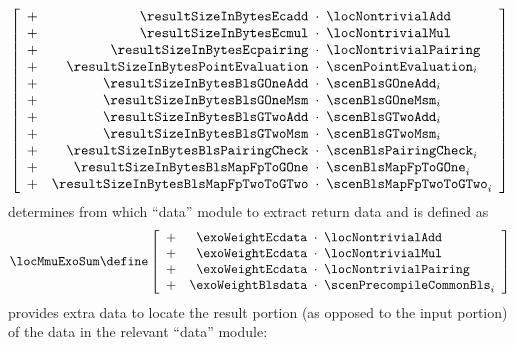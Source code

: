 \begin{description}
\begin{description}
\[					\left[ \begin{array}{crcl}
						+ & \resultSizeInBytesEcadd             & \!\!\!\cdot\!\!\! & \locNontrivialAdd            \\
						+ & \resultSizeInBytesEcmul             & \!\!\!\cdot\!\!\! & \locNontrivialMul            \\
						+ & \resultSizeInBytesEcpairing         & \!\!\!\cdot\!\!\! & \locNontrivialPairing        \\
						+ & \resultSizeInBytesPointEvaluation   & \!\!\!\cdot\!\!\! & \scenPointEvaluation    _{i} \\
						+ & \resultSizeInBytesBlsGOneAdd        & \!\!\!\cdot\!\!\! & \scenBlsGOneAdd         _{i} \\
						+ & \resultSizeInBytesBlsGOneMsm        & \!\!\!\cdot\!\!\! & \scenBlsGOneMsm         _{i} \\
						+ & \resultSizeInBytesBlsGTwoAdd        & \!\!\!\cdot\!\!\! & \scenBlsGTwoAdd         _{i} \\
						+ & \resultSizeInBytesBlsGTwoMsm        & \!\!\!\cdot\!\!\! & \scenBlsGTwoMsm         _{i} \\
						+ & \resultSizeInBytesBlsPairingCheck   & \!\!\!\cdot\!\!\! & \scenBlsPairingCheck    _{i} \\
						+ & \resultSizeInBytesBlsMapFpToGOne    & \!\!\!\cdot\!\!\! & \scenBlsMapFpToGOne     _{i} \\
						+ & \resultSizeInBytesBlsMapFpTwoToGTwo & \!\!\!\cdot\!\!\! & \scenBlsMapFpTwoToGTwo  _{i} \\
					\end{array} \right]
				\]
				\locMmuExoSum{} determines from which ``data'' module to extract return data and is defined as
				\[
					\locMmuExoSum \define
					\left[ \begin{array}{crclcl}
						+ & \exoWeightEcdata  & \!\!\!\cdot\!\!\! & \locNontrivialAdd             \\
						+ & \exoWeightEcdata  & \!\!\!\cdot\!\!\! & \locNontrivialMul             \\
						+ & \exoWeightEcdata  & \!\!\!\cdot\!\!\! & \locNontrivialPairing         \\
						+ & \exoWeightBlsdata & \!\!\!\cdot\!\!\! & \scenPrecompileCommonBls _{i} \\
					\end{array} \right]
				\]
				\locMmuPhase{} provides extra data to locate the result portion (as opposed to the input portion)
				of the data in the relevant ``data'' module:

\end{description}
\end{description}

